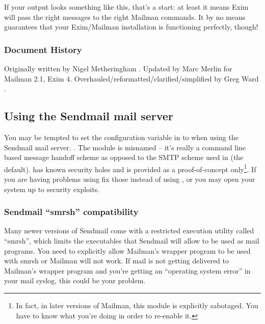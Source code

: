 \documentclass{howto}
\begin{document}
If your  output looks something like this, that's a start:
at least it means Exim will pass the right messages to the right Mailman
commands.  It by no means guarantees that your Exim/Mailman installation is
functioning perfectly, though!

\subsubsection{Document History}

Originally written by Nigel Metheringham .  Updated
by Marc Merlin  for Mailman 2.1, Exim 4.
Overhauled/reformatted/clarified/simplified by Greg Ward
.

\subsection{Using the Sendmail mail server}

\begin{notice}[warning]
You may be tempted to set the  configuration variable in
 to  when using the Sendmail mail server.
.  The  module is misnamed -- it's really a
command line based message handoff scheme as opposed to the SMTP scheme used
in  (the default).   has known security
holes and is provided as a proof-of-concept only\footnote{In fact, in later
versions of Mailman, this module is explicitly sabotaged.  You have to know
what you're doing in order to re-enable it.}.  If you are having problems
using  fix those instead of using , or
you may open your system up to security exploits.
\end{notice}

\subsubsection{Sendmail ``smrsh'' compatibility}

Many newer versions of Sendmail come with a restricted execution utility
called ``smrsh'', which limits the executables that Sendmail will allow to be
used as mail programs.  You need to explicitly allow Mailman's wrapper program
to be used with smrsh or Mailman will not work.  If mail is not getting
delivered to Mailman's wrapper program and you're getting an ``operating
system error'' in your mail syslog, this could be your problem.
\end{document}

